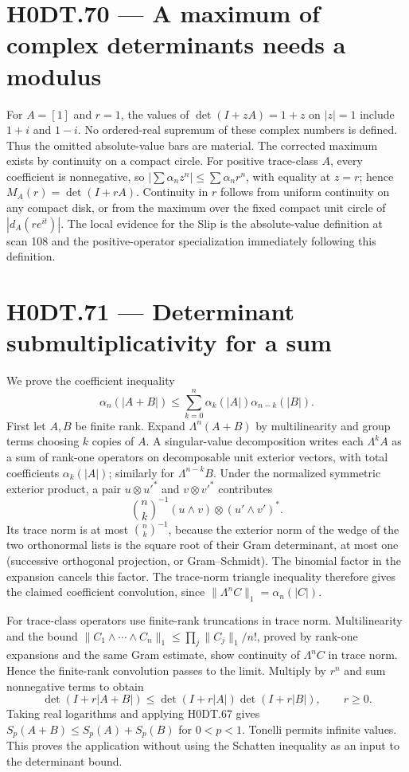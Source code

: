 \section*{H0DT.70 --- A maximum of complex determinants needs a modulus}
For $A=[1]$ and $r=1$, the values of $\det(I+zA)=1+z$ on $|z|=1$ include $1+i$ and $1-i$. No ordered-real supremum of these complex numbers is defined. Thus the omitted absolute-value bars are material. The corrected maximum exists by continuity on a compact circle. For positive trace-class $A$, every coefficient is nonnegative, so $|\sum\alpha_n z^n|\le\sum\alpha_n r^n$, with equality at $z=r$; hence $M_A(r)=\det(I+rA)$. Continuity in $r$ follows from uniform continuity on any compact disk, or from the maximum over the fixed compact unit circle of $|d_A(re^{it})|$. The local evidence for the Slip is the absolute-value definition at scan 108 and the positive-operator specialization immediately following this definition.

\section*{H0DT.71 --- Determinant submultiplicativity for a sum}
We prove the coefficient inequality
\[
 \alpha_n(|A+B|)\le\sum_{k=0}^n\alpha_k(|A|)\alpha_{n-k}(|B|).
\]
First let $A,B$ be finite rank. Expand $\Lambda^n(A+B)$ by multilinearity and group terms choosing $k$ copies of $A$. A singular-value decomposition writes each $\Lambda^k A$ as a sum of rank-one operators on decomposable unit exterior vectors, with total coefficients $\alpha_k(|A|)$; similarly for $\Lambda^{n-k}B$. Under the normalized symmetric exterior product, a pair $u\otimes u'^*$ and $v\otimes v'^*$ contributes
\[
 \binom nk^{-1}(u\wedge v)\otimes(u'\wedge v')^*.
\]
Its trace norm is at most $\binom nk^{-1}$, because the exterior norm of the wedge of the two orthonormal lists is the square root of their Gram determinant, at most one (successive orthogonal projection, or Gram--Schmidt). The binomial factor in the expansion cancels this factor. The trace-norm triangle inequality therefore gives the claimed coefficient convolution, since $\|\Lambda^n C\|_1=\alpha_n(|C|)$.

For trace-class operators use finite-rank truncations in trace norm. Multilinearity and the bound $\|C_1\wedge\cdots\wedge C_n\|_1\le\prod_j\|C_j\|_1/n!$, proved by rank-one expansions and the same Gram estimate, show continuity of $\Lambda^n C$ in trace norm. Hence the finite-rank convolution passes to the limit. Multiply by $r^n$ and sum nonnegative terms to obtain
\[
 \det(I+r|A+B|)\le\det(I+r|A|)\det(I+r|B|),\qquad r\ge0.
\]
Taking real logarithms and applying H0DT.67 gives $S_p(A+B)\le S_p(A)+S_p(B)$ for $0<p<1$. Tonelli permits infinite values. This proves the application without using the Schatten inequality as an input to the determinant bound.

